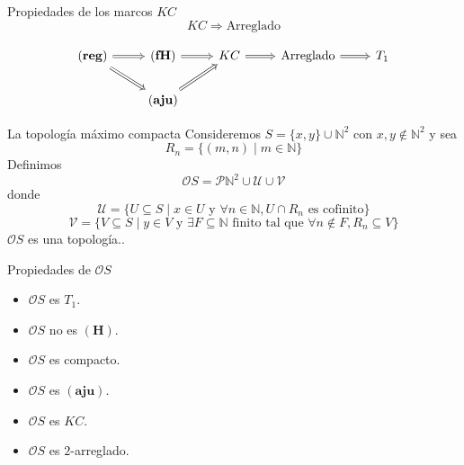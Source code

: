 \documentclass[compress,12pt]{beamer}
\newtheorem{prop}{Proposición}
\begin{document}
\begin{frame}[fragile]{Propiedades de los marcos $KC$}
\[
KC\Rightarrow \mbox{Arreglado}
\]


\[\begin{tikzcd}
	{\mathbf{(reg)}} & {\mathbf{(fH)}} & KC & {\mbox{Arreglado}} & {T_1} \\
	& {\mathbf{(aju)}} && {}
	\arrow[Rightarrow, from=1-1, to=1-2]
	\arrow[Rightarrow, from=1-1, to=2-2]
	\arrow[Rightarrow, from=1-2, to=1-3]
	\arrow[Rightarrow, from=1-3, to=1-4]
	\arrow[Rightarrow, from=1-4, to=1-5]
	\arrow[Rightarrow, from=2-2, to=1-3]
\end{tikzcd}\]

\end{frame}

\begin{frame}{La topología máximo compacta}
Consideremos $S=\{x,y\}\cup \mathbb{N}^2$ con $x,y\notin \mathbb{N}^2$ y sea 
\[
R_n=\{(m,n)\mid m\in \mathbb{N}\}
\]
Definimos 
\[
\mathcal{O}S=\mathcal{P}\mathbb{N}^2 \cup \mathcal{U}\cup\mathcal{V}
\]
donde
\[
\mathcal{U}=\{U\subseteq S\mid x\in U\mbox{ y }\forall n\in \mathbb{N}, U\cap R_n\mbox{ es cofinito}\}
\]
\[
\mathcal{V}=\{V\subseteq S\mid y\in V \mbox{ y }\exists F\subseteq \mathbb{N}\mbox{ finito tal que }\forall n\notin F, R_n\subseteq V \}
\]
$\mathcal{O}S$ es una topología..
\end{frame}

\begin{frame}{Propiedades de $\mathcal{O}S$}
	\begin{itemize}
	\item $\mathcal{O}S$ es $T_1$.
	\item $\mathcal{O}S$ no es $\mathbf{(H)}$.
	\item $\mathcal{O}S$ es compacto.
	\item $\mathcal{O}S$ es $\mathbf{(aju)}$.
	\item $\mathcal{O}S$ es $KC$.
	\item $\mathcal{O}S$ es $2$-arreglado.
	\end{itemize}
\end{frame}
\end{document}
